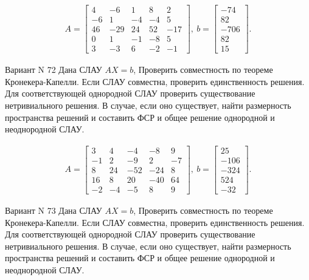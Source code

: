 \documentclass[11pt]{report}
\begin{document}
\begin{align*}
 A = \left[\begin{matrix}4 & -6 & 1 & 8 & 2\\-6 & 1 & -4 & -4 & 5\\46 & -29 & 24 & 52 & -17\\0 & 1 & -1 & -8 & 5\\3 & -3 & 6 & -2 & -1\end{matrix}\right],
\ b = \left[\begin{matrix}-74\\82\\-706\\82\\15\end{matrix}\right]. 
 \end{align*}

Вариант N 72
Дана СЛАУ $AX = b$,
Проверить совместность по теореме Кронекера-Капелли. Если СЛАУ совместна, проверить единственность решения.
Для соответствующей однородной СЛАУ проверить существование нетривиального решения. В случае, если оно существует,
найти размерность пространства решений и составить ФСР и общее решение однородной  и неоднородной СЛАУ.


\begin{align*}
 A = \left[\begin{matrix}3 & 4 & -4 & -8 & 9\\-1 & 2 & -9 & 2 & -7\\8 & 24 & -52 & -24 & 8\\16 & 8 & 20 & -40 & 64\\-2 & -4 & -5 & 8 & 9\end{matrix}\right],
\ b = \left[\begin{matrix}25\\-106\\-324\\524\\-32\end{matrix}\right]. 
 \end{align*}

Вариант N 73
Дана СЛАУ $AX = b$,
Проверить совместность по теореме Кронекера-Капелли. Если СЛАУ совместна, проверить единственность решения.
Для соответствующей однородной СЛАУ проверить существование нетривиального решения. В случае, если оно существует,
найти размерность пространства решений и составить ФСР и общее решение однородной  и неоднородной СЛАУ.
\end{document}
